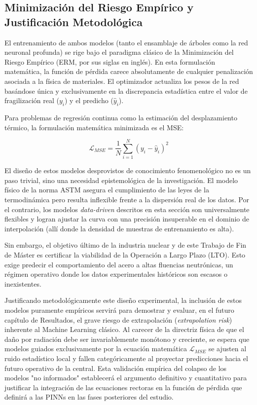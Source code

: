\documentclass[a4paper, 12pt, twocolumn]{book}
\begin{document}
\subsection{Minimización del Riesgo Empírico y Justificación Metodológica}

El entrenamiento de ambos modelos (tanto el ensamblaje de árboles como la red neuronal profunda) se rige bajo el paradigma clásico de la Minimización del Riesgo Empírico (ERM, por sus siglas en inglés). En esta formulación matemática, la función de pérdida carece absolutamente de cualquier penalización asociada a la física de materiales. El optimizador actualiza los pesos de la red basándose única y exclusivamente en la discrepancia estadística entre el valor de fragilización real ($y_i$) y el predicho ($\hat{y}_i$).

Para problemas de regresión continua como la estimación del desplazamiento térmico, la formulación matemática minimizada es el MSE:

\begin{equation}
    \mathcal{L}_{MSE} = \frac{1}{N} \sum_{i=1}^{N} (y_i - \hat{y}_i)^2
\end{equation}

El diseño de estos modelos desprovistos de conocimiento fenomenológico no es un paso trivial, sino una necesidad epistemológica de la investigación. El modelo físico de la norma ASTM asegura el cumplimiento de las leyes de la termodinámica pero resulta inflexible frente a la dispersión real de los datos. Por el contrario, los modelos \textit{data-driven} descritos en esta sección son universalmente flexibles y logran ajustar la curva con una precisión insuperable en el dominio de interpolación (allí donde la densidad de muestras de entrenamiento es alta).

Sin embargo, el objetivo último de la industria nuclear y de este Trabajo de Fin de Máster es certificar la viabilidad de la Operación a Largo Plazo (LTO). Esto exige predecir el comportamiento del acero a altas fluencias neutrónicas, un régimen operativo donde los datos experimentales históricos son escasos o inexistentes. 

Justificando metodológicamente este diseño experimental, la inclusión de estos modelos puramente empíricos servirá para demostrar y evaluar, en el futuro capítulo de Resultados, el grave riesgo de extrapolación (\textit{extrapolation risk}) inherente al Machine Learning clásico. Al carecer de la directriz física de que el daño por radiación debe ser invariablemente monótono y creciente, se espera que modelos guiados exclusivamente por la ecuación matemática $\mathcal{L}_{MSE}$ se ajusten al ruido estadístico local y fallen categóricamente al proyectar predicciones hacia el futuro operativo de la central. Esta validación empírica del colapso de los modelos "no informados" establecerá el argumento definitivo y cuantitativo para justificar la integración de las ecuaciones rectoras en la función de pérdida que definirá a las PINNs en las fases posteriores del estudio.
\end{document}
